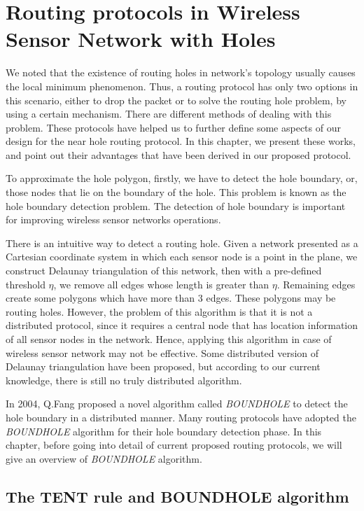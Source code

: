\chapter{Routing protocols in Wireless Sensor Network with Holes}\label{chapter3}
We noted that the existence of routing holes in network's topology usually causes the local minimum phenomenon. Thus, a routing protocol has only two options in this scenario, either to drop the packet or to solve the routing hole problem, by using a certain mechanism. There are different methods of dealing with this problem. These protocols have helped us to further define some aspects of our design for the near hole routing protocol. In this chapter, we present these works, and point out their advantages that have been derived in our proposed protocol. 

To approximate the hole polygon, firstly, we have to detect the hole boundary, or, those nodes that lie on the boundary of the hole. This problem is known as the hole boundary detection problem. The detection of hole boundary is important for improving wireless sensor networks operations. 

There is an intuitive way to detect a routing hole. Given a network presented as a Cartesian coordinate system in which each sensor node is a point in the plane, we construct Delaunay triangulation of this network, then with a pre-defined threshold $\eta$, we remove all edges whose length is greater than $\eta$. Remaining edges create some polygons which have more than 3 edges. These polygons may be routing holes. However, the problem of this algorithm is that it is not a distributed protocol, since it requires a central node that has location information of all sensor nodes in the network. Hence, applying this algorithm in case of wireless sensor network may not be effective. Some distributed version of Delaunay triangulation have been proposed, but according to our current knowledge, there is still no truly distributed algorithm.

In 2004, Q.Fang proposed a novel algorithm called \emph{BOUNDHOLE} to detect the hole boundary in a distributed manner. Many routing protocols have adopted the \emph{BOUNDHOLE} algorithm for their hole boundary detection phase. In this chapter, before going into detail of current proposed routing protocols, we will give an overview of \emph{BOUNDHOLE} algorithm.
\section{The TENT rule and BOUNDHOLE algorithm} \label{chapter3.1-boundhole}

